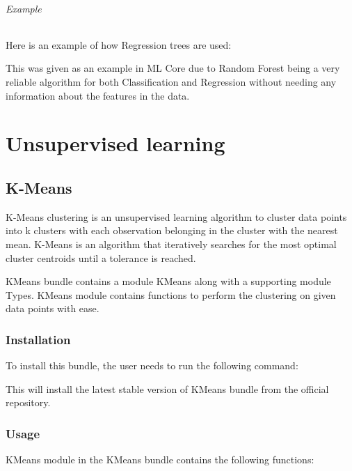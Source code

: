 \paragraph{Example}

Here is an example of how Regression trees are used:



This was given as an example in ML Core due to Random Forest being a very reliable algorithm for both Classification and Regression without needing any information about the features in the data.

\part{Unsupervised learning}\label{part:unsupe}

\chapter{K-Means}\label{unsupe:kmeans}

K-Means clustering is an unsupervised learning algorithm to cluster data points into k clusters with each observation belonging in the cluster with the nearest mean. K-Means is an algorithm that iteratively searches for the most optimal cluster centroids until a tolerance is reached.

KMeans bundle contains a module KMeans along with a supporting module Types. KMeans module contains functions to perform the clustering on given data points with ease.

\section{Installation}

To install this bundle, the user needs to run the following command:



This will install the latest stable version of KMeans bundle from the official repository.

\section{Usage}

KMeans module in the KMeans bundle contains the following functions:

